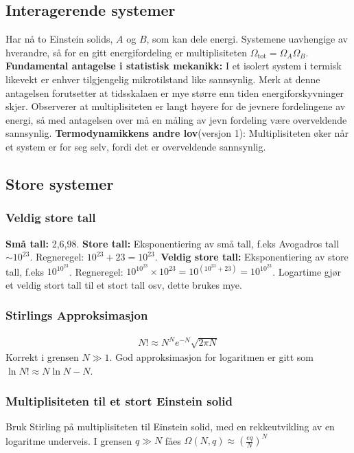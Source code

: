\documentclass[12pt]{article}
\begin{document}
\subsection{Interagerende systemer}
Har nå to Einstein solids, $A$ og $B$, som kan dele energi. Systemene uavhengige
av hverandre, så for en gitt energifordeling er multiplisiteten $\Omega_\text{tot} = \Omega_A \Omega_B$.\newline \noindent
\textbf{Fundamental antagelse i statistisk mekanikk:} I et isolert system i termisk
likevekt er enhver tilgjengelig mikrotilstand like sannsynlig. Merk at denne antagelsen
forutsetter at tidsskalaen er mye større enn tiden energiforskyvninger skjer. \newline \noindent
Observerer at multiplisiteten er langt høyere for de jevnere fordelingene av energi,
så med antagelsen over må en måling av jevn fordeling være overveldende sannsynlig.
\textbf{Termodynamikkens andre lov}(versjon 1): Multiplisiteten øker når et system
er for seg selv, fordi det er overveldende sannsynlig.
\subsection{Store systemer}
\subsubsection{Veldig store tall}
\textbf{Små tall:} 2,6,98. \textbf{Store tall:} Eksponentiering av små tall, f.eks
Avogadros tall $\sim 10^{23}$. Regneregel: $10^{23} + 23 = 10^{23}$.
\textbf{Veldig store tall:} Eksponentiering av store tall, f.eks $10^{10^{23}}$.
Regneregel: $10^{10^{23}} \times 10^{23} = 10^{(10^{23} + 23)} = 10^{10^{23}}$.
Logartime gjør et veldig stort tall til et stort tall osv, dette brukes mye.
\subsubsection{Stirlings Approksimasjon}
\begin{align*}
  N! \approx N^N e^{-N}\sqrt{2\pi N}
\end{align*}
Korrekt i grensen $N \gg 1$. God approksimasjon for logaritmen er gitt som $\ln{N!} \approx N \ln N - N$.
\subsubsection{Multiplisiteten til et stort Einstein solid}
Bruk Stirling på multiplisiteten til Einstein solid, med en rekkeutvikling av en
logaritme underveis. I grensen $q \gg N$ fåes
$\Omega(N,q) \approx \left(\frac{eq}{N}\right)^N$
\end{document}
